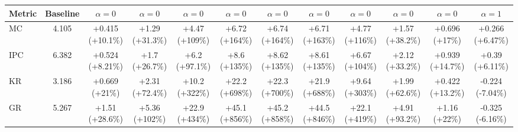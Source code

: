 \begin{tabular}{lccccccccccc}
\toprule
Metric & Baseline & $\alpha=0$ & $\alpha=0$ & $\alpha=0$ & $\alpha=0$ & $\alpha=0$ & $\alpha=0$ & $\alpha=0$ & $\alpha=0$ & $\alpha=0$ & $\alpha=1$ \\
\midrule
MC & 4.105 & +0.415 (+10.1\%) & +1.29 (+31.3\%) & +4.47 (+109\%) & +6.72 (+164\%) & +6.74 (+164\%) & +6.71 (+163\%) & +4.77 (+116\%) & +1.57 (+38.2\%) & +0.696 (+17\%) & +0.266 (+6.47\%) \\
IPC & 6.382 & +0.524 (+8.21\%) & +1.7 (+26.7\%) & +6.2 (+97.1\%) & +8.6 (+135\%) & +8.62 (+135\%) & +8.61 (+135\%) & +6.67 (+104\%) & +2.12 (+33.2\%) & +0.939 (+14.7\%) & +0.39 (+6.11\%) \\
KR & 3.186 & +0.669 (+21\%) & +2.31 (+72.4\%) & +10.2 (+322\%) & +22.2 (+698\%) & +22.3 (+700\%) & +21.9 (+688\%) & +9.64 (+303\%) & +1.99 (+62.6\%) & +0.422 (+13.2\%) & -0.224 (-7.04\%) \\
GR & 5.267 & +1.51 (+28.6\%) & +5.36 (+102\%) & +22.9 (+434\%) & +45.1 (+856\%) & +45.2 (+858\%) & +44.5 (+846\%) & +22.1 (+419\%) & +4.91 (+93.2\%) & +1.16 (+22\%) & -0.325 (-6.16\%) \\
\bottomrule
\end{tabular}
